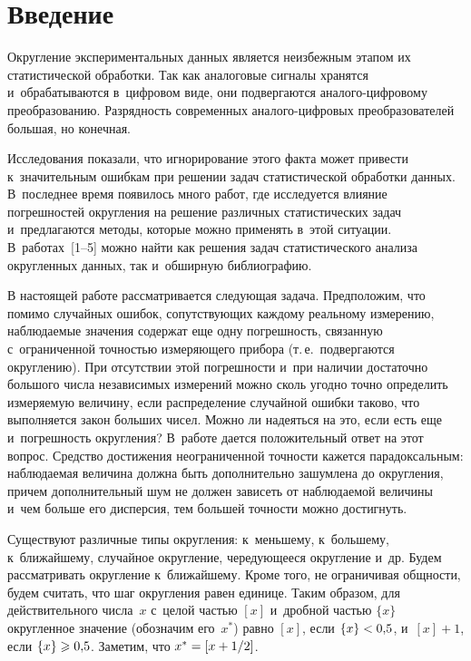 \begin{multicols}{2}

\label{st\stat}

\section{Введение}

Округление экспериментальных данных является неизбежным этапом их статистической 
обработки. Так как аналоговые сигналы хранятся и~обрабатываются в~цифровом виде,
они подвергаются ана\-ло\-го-циф\-ро\-во\-му преобразованию. Разрядность современных 
ана\-ло\-го-циф\-ро\-вых преобразователей большая, но конечная.

Исследования показали, что игнорирование этого факта может привести 
к~значительным ошибкам при решении  задач статистической обработки данных. 
В~последнее время
появилось много работ, где исследуется влияние погрешностей округления на 
решение различных статистических задач и~предлагаются методы, которые можно 
применять в~этой ситуации. В~работах~[1--5] можно найти как решения задач 
статистического анализа округленных данных, так и~обширную библиографию.

В настоящей работе рассматривается следу\-ющая задача. Предположим, что помимо 
случайных ошибок, сопутствующих каждому реальному измерению, наблюдаемые
 значения содержат еще одну погрешность, связанную с~ограниченной точностью 
 измеряющего прибора (т.\,е.\ подвергаются округлению). При отсутствии этой 
 погрешности и~при наличии
 достаточно большого числа независимых измерений можно сколь угодно точно 
 определить измеряемую величину, если распределение случайной ошибки таково, 
 что выполняется
 закон больших чисел. Можно ли надеяться на это, если есть еще и~погрешность 
 округления? В~работе дается положительный ответ на этот вопрос. Средство достижения 
 неограниченной
 точности кажется парадоксальным: наблюдаемая величина должна быть дополнительно 
 зашумлена до округления, причем дополнительный шум не должен зависеть от наблюдаемой 
 величины и~чем больше его дисперсия, тем большей точности можно достигнуть.

Существуют различные типы округления: к~меньшему, к~большему, 
к~ближайшему, случайное округление, чередующееся округление и~др.
Будем рассматривать округление к~ближайшему. Кроме того, не
ограничивая общности, будем считать, что шаг округления равен
единице. Таким образом, для действительного числа~$x$ с~целой частью
$[x]$ и~дробной частью $\{x\}$ округленное значение (обозначим его~$x^\ast$) 
равно $[x]$, если $\{x\}\hm<0{,}5$, и~$[x]+1$, если
$\{x\}\hm\geqslant0{,}5$. Заметим, что $x^\ast\hm=[x\hm+1/2]$.



\end{multicols}
